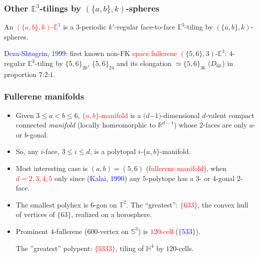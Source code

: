 \documentclass{beamer}
\newcommand{\RR}{\ensuremath{\mathbb{R}}}
\begin{document}
\begin{frame}\frametitle{Other  $\mathbb{E}^3$-tilings by $(\{a,b\},k)$-spheres}
\vspace{-2mm}


An \textcolor{red}{$(\{a,b\},k)$-$\mathbb{E}^3$} is a $3$-periodic $k'$-regular face-to-face 
$\mathbb{E}^3$-tiling
by $(\{a,b\},k)$-spheres. 

\textcolor{blue}{Deza-Shtogrin, 1999}: first  known non-FK \textcolor{red}{space 
fullerene} 
$(\{5,6\},3)$-$\mathbb{E}^3$: $4$-regular
 $\mathbb{E}^3$-tiling by $\{5,6\}_{20}$, $\{5,6\}_{24}$ and its elongation $\simeq \{5,6\}_{36}$ 
($D_{6h}$) in proportion $7$:$2$:$1$.



\end{frame}

\begin{frame}\frametitle{Fullerene manifolds}
\vspace{-1mm}
\begin{itemize}
\item Given $3\le a<b\le 6$, \textcolor{red}{$\{a,b\}$-manifold} is a 
$(d$$-$$1)$-dimensional 
$d$-valent compact 
connected {\em manifold}
(locally homeomorphic   to $\RR^{d-1}$) whose
$2$-faces are  only $a$- or $b$-gonal.
\item
So, any $i$-face, $3\leq i\leq d$, is a polytopal $i$-$\{a,b\}$-manifold.
\item 
Most interesting case is $(a,b)=(5,6)$ (\textcolor{red}{fullerene manifold}), 
when \textcolor{red}{$d=2,3,4,5$} only since  
(\textcolor{blue}{Kalai, 1990}) 
any
$5$-polytope has a $3$- or $4$-gonal $2$-face.
\pause

\item 
The smallest polyhex is $6$-gon on  $\mathbb{T}^2$.
The ``greatest'': \textcolor{red}{$\{633\}$}, the convex hull of
vertices
of $\{63\}$, realized on a horosphere.

\item 
Prominent $4$-fullerene ($600$-vertex on $\mathbb{S}^3$) is   
\textcolor{red}{$120$-cell} 
(\textcolor{blue}{$\{533\}$}).

The ''greatest'' polypent: \textcolor{red}{$\{5333\}$}, tiling of
$\mathbb{H}^4$ by
$120$-cells.



\end{itemize}

\end{frame}
\end{document}
